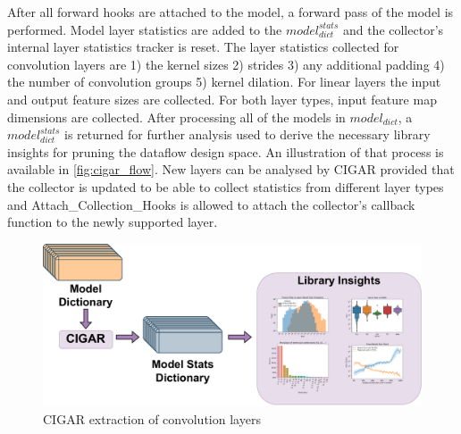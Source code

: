 After all forward hooks are attached to the model, a forward pass of the model
is performed. Model layer statistics are added to the $model^{stats}_{dict}$ and
the collector's internal layer statistics tracker is reset. The layer statistics
collected for convolution layers are 1) the kernel sizes 2) strides 3) any additional padding
4) the number of convolution groups 5) kernel dilation. For linear layers the input and output feature sizes are collected.
For both layer types, input feature map dimensions are collected. 
After processing all of the models in $model_{dict}$, a $model^{stats}_{dict}$ is
returned for further analysis used to derive the necessary library insights for
pruning the dataflow design space. An illustration of that process is available
in \autoref{fig:cigar_flow}. New layers can be analysed by CIGAR provided that the
collector is updated to be able to collect statistics from different layer types
and Attach\_Collection\_Hooks is allowed to attach the collector's callback
function to the newly supported layer. 

\begin{figure}
    \centering
    \includegraphics[scale=0.4]{fig/Cigar_flow.pdf}
    \caption{\ac{CIGAR} extraction of convolution layers}
    \label{fig:cigar_flow}
\end{figure}

